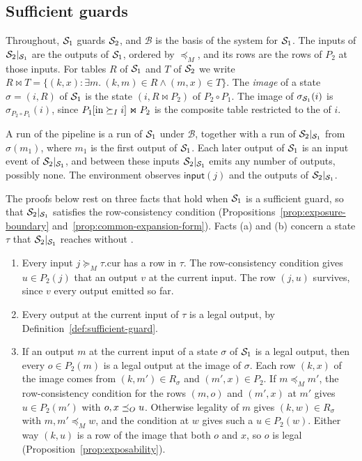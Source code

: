 \subsection{Sufficient guards}

Throughout, $\mathcal{S}_1$ guards $\mathcal{S}_2$, and $\mathcal B$ is the basis of the
system for $\mathcal{S}_1$.  The inputs of $\mathcal{S}_2|_{\mathcal{S}_1}$ are the outputs of
$\mathcal{S}_1$, ordered by $\preceq_M$, and its rows are the rows of $P_2$ at those
inputs.  For tables $R$ of $\mathcal{S}_1$ and $T$ of $\mathcal{S}_2$ we write $R\Join
T=\{(k,x):\exists m.\ (k,m)\in R\land(m,x)\in T\}$.  The \emph{image} of a
state $\sigma=(i,R)$ of $\mathcal{S}_1$ is the state $(i,R\Join P_2)$ of
$P_2\circ P_1$.  The image of $\sigma_{\mathcal{S}_1}(i)$ is
$\sigma_{P_2\circ P_1}(i)$, since $P_1[\mathrm{in}\succeq_I i]\Join P_2$ is the
composite table restricted to the \indescs of $i$.

A run of the pipeline is a run of $\mathcal{S}_1$ under $\mathcal B$, together with
a run of $\mathcal{S}_2|_{\mathcal{S}_1}$ from $\sigma(m_1)$, where $m_1$ is the first
output of $\mathcal{S}_1$.  Each later output of $\mathcal{S}_1$ is an input event of
$\mathcal{S}_2|_{\mathcal{S}_1}$, and between these inputs $\mathcal{S}_2|_{\mathcal{S}_1}$ emits any
number of outputs, possibly none.  The environment observes
$\mathsf{input}(j)$ and the outputs of $\mathcal{S}_2|_{\mathcal{S}_1}$.

The proofs below rest on three facts that hold when $\mathcal{S}_1$ is a sufficient
guard, so that $\mathcal{S}_2|_{\mathcal{S}_1}$ satisfies the row-consistency condition
(Propositions~\ref{prop:exposure-boundary}
and~\ref{prop:common-expansion-form}).  Facts (a) and (b) concern a state $\tau$ that
$\mathcal{S}_2|_{\mathcal{S}_1}$ reaches without \commitment.
\begin{enumerate}[label=(\alph*)]
\item Every input $j\succeq_M\tau.\mathrm{cur}$ has a row in $\tau$.  The
  row-consistency condition gives $u\in P_2(j)$ that \outrel an output $v$ at
  the current input.  The row $(j,u)$ survives, since $v$ \outrel every output
  emitted so far.
\item Every output at the current input of $\tau$ is a legal output, by
  Definition~\ref{def:sufficient-guard}.
\item If an output $m$ at the current input of a state $\sigma$ of $\mathcal{S}_1$
  is a legal output, then every $o\in P_2(m)$ is a legal output at the image
  of $\sigma$.  Each row $(k,x)$ of the image comes from $(k,m')\in R_\sigma$
  and $(m',x)\in P_2$.  If $m\preceq_M m'$, the row-consistency condition for
  the rows $(m,o)$ and $(m',x)$ at $m'$ gives $u\in P_2(m')$ with
  $o,x\preceq_O u$.  Otherwise legality of $m$ gives $(k,w)\in R_\sigma$ with
  $m,m'\preceq_M w$, and the condition at $w$ gives such a $u\in P_2(w)$.
  Either way $(k,u)$ is a row of the image that \outrel both $o$ and $x$, so
  $o$ is legal (Proposition~\ref{prop:exposability}).
\end{enumerate}

